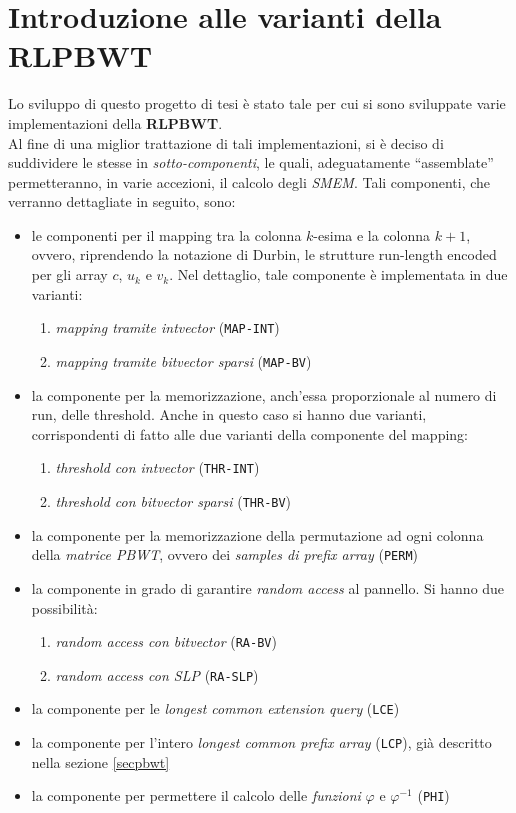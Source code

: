 \section{Introduzione alle varianti della RLPBWT}
Lo sviluppo di questo progetto di tesi è stato tale per cui si sono sviluppate
varie implementazioni della \textbf{RLPBWT}.\\
Al fine di una miglior trattazione di tali implementazioni, si è deciso di
suddividere le stesse in \textit{sotto-componenti}, le quali, adeguatamente
``assemblate'' permetteranno, in varie accezioni, il calcolo degli
\textit{SMEM}. Tali componenti, che verranno dettagliate in seguito, sono:
\begin{itemize}
  \item le componenti per il mapping tra la colonna $k$-esima e la colonna
  $k+1$, ovvero, riprendendo la notazione di Durbin, le strutture run-length
  encoded per gli array $c$, $u_k$ e $v_k$. Nel dettaglio, tale componente è
  implementata in due varianti:
  \begin{enumerate}
    \item \textit{mapping tramite intvector} (\texttt{MAP-INT})
    \item \textit{mapping tramite bitvector sparsi} (\texttt{MAP-BV})
  \end{enumerate}
  \item la componente per la memorizzazione, anch'essa proporzionale al numero
  di run, delle threshold. Anche in questo caso si hanno due varianti,
  corrispondenti di fatto alle due varianti della componente del mapping:
  \begin{enumerate}
    \item \textit{threshold con intvector} (\texttt{THR-INT})
    \item \textit{threshold con bitvector sparsi} (\texttt{THR-BV})
  \end{enumerate}
  \item la componente per la memorizzazione della permutazione ad ogni colonna
  della \textit{matrice PBWT}, ovvero dei \textit{samples di prefix array}
  (\texttt{PERM}) 
  \item la componente in grado di garantire \textit{random access} al
  pannello. Si hanno due possibilità:
  \begin{enumerate}
    \item \textit{random access con bitvector} (\texttt{RA-BV})
    \item \textit{random access con SLP} (\texttt{RA-SLP})
  \end{enumerate}
  \item la componente per le \textit{longest common extension query}
  (\texttt{LCE}) 
  \item la componente per l'intero \textit{longest common prefix array}
  (\texttt{LCP}), già descritto nella sezione \ref{secpbwt}
  \item la componente per permettere il calcolo delle \textit{funzioni}
  $\varphi$ e $\varphi^{-1}$ (\texttt{PHI})
\end{itemize}
